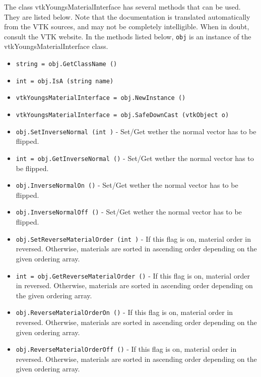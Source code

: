 The class vtkYoungsMaterialInterface has several methods that can be used.
  They are listed below.
Note that the documentation is translated automatically from the VTK sources,
and may not be completely intelligible.  When in doubt, consult the VTK website.
In the methods listed below, \verb|obj| is an instance of the vtkYoungsMaterialInterface class.
\begin{itemize}
\item  \verb|string = obj.GetClassName ()|

\item  \verb|int = obj.IsA (string name)|

\item  \verb|vtkYoungsMaterialInterface = obj.NewInstance ()|

\item  \verb|vtkYoungsMaterialInterface = obj.SafeDownCast (vtkObject o)|

\item  \verb|obj.SetInverseNormal (int )| -  Set/Get wether the normal vector has to be flipped.

\item  \verb|int = obj.GetInverseNormal ()| -  Set/Get wether the normal vector has to be flipped.

\item  \verb|obj.InverseNormalOn ()| -  Set/Get wether the normal vector has to be flipped.

\item  \verb|obj.InverseNormalOff ()| -  Set/Get wether the normal vector has to be flipped.

\item  \verb|obj.SetReverseMaterialOrder (int )| -  If this flag is on, material order in reversed. 
 Otherwise, materials are sorted in ascending order depending on the given ordering array.

\item  \verb|int = obj.GetReverseMaterialOrder ()| -  If this flag is on, material order in reversed. 
 Otherwise, materials are sorted in ascending order depending on the given ordering array.

\item  \verb|obj.ReverseMaterialOrderOn ()| -  If this flag is on, material order in reversed. 
 Otherwise, materials are sorted in ascending order depending on the given ordering array.

\item  \verb|obj.ReverseMaterialOrderOff ()| -  If this flag is on, material order in reversed. 
 Otherwise, materials are sorted in ascending order depending on the given ordering array.


\end{itemize}
